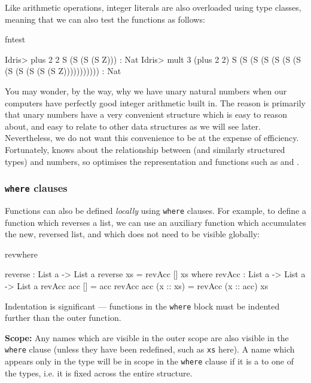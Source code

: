 \noindent
Like arithmetic operations, integer literals are also overloaded using type classes, 
meaning that we can also test the functions as follows:

\begin{SaveVerbatim}{fntest}

Idris> plus 2 2 
S (S (S (S Z))) : Nat
Idris> mult 3 (plus 2 2)
S (S (S (S (S (S (S (S (S (S (S (S Z))))))))))) : Nat

\end{SaveVerbatim}

\noindent
You may wonder, by the way, why we have unary natural numbers when our
computers have perfectly good integer arithmetic built in. The reason is
primarily that unary numbers have a very convenient structure which is easy to
reason about, and easy to relate to other data structures as we will see later.
Nevertheless, we do not want this convenience to be at the expense of
efficiency. Fortunately, \Idris{} knows about the relationship between
 (and similarly structured types) and numbers, so optimises the
representation and functions such as  and .

\subsubsection*{\texttt{where} clauses}

Functions can also be defined \emph{locally} using \texttt{where} clauses. For example,
to define a function which reverses a list, we can use an auxiliary function which
accumulates the new, reversed list, and which does not need to be visible globally:

\begin{SaveVerbatim}{revwhere}

reverse : List a -> List a
reverse xs = revAcc [] xs where
  revAcc : List a -> List a -> List a
  revAcc acc [] = acc
  revAcc acc (x :: xs) = revAcc (x :: acc) xs

\end{SaveVerbatim}

\noindent
Indentation is significant --- functions in the \texttt{where} block must be indented
further than the outer function.

\textbf{Scope:} 
Any names which are visible in the outer scope are also visible in the
\texttt{where} clause (unless they have been redefined, such as \texttt{xs}
here). A name which appears only in the type will be in scope in the
\texttt{where} clause if it is a  to one of the types,
i.e. it is fixed across the entire structure. 

